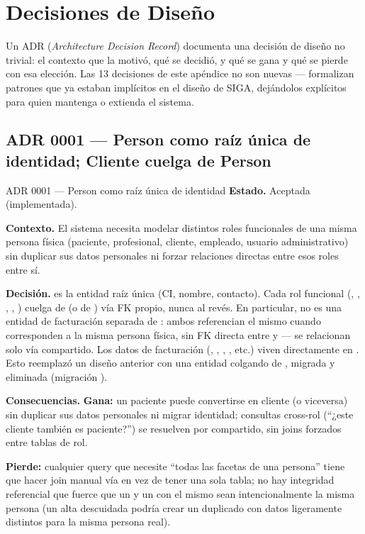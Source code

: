 \chapter{Decisiones de Diseño}
\label{sec:adr}

Un ADR (\emph{Architecture Decision Record}) documenta una decisión de diseño no trivial: el contexto que la motivó, qué se decidió, y qué se gana y qué se pierde con esa elección. Las 13 decisiones de este apéndice no son nuevas --- formalizan patrones que ya estaban implícitos en el diseño de SIGA, dejándolos explícitos para quien mantenga o extienda el sistema.

\section{ADR 0001 --- Person como raíz única de identidad; Cliente cuelga de Person}
\label{adr:0001}

\begin{cajaADR}{ADR 0001 --- Person como raíz única de identidad}
\textbf{Estado.} Aceptada (implementada).

\textbf{Contexto.} El sistema necesita modelar distintos roles funcionales de una misma persona física (paciente, profesional, cliente, empleado, usuario administrativo) sin duplicar sus datos personales ni forzar relaciones directas entre esos roles entre sí.

\textbf{Decisión.}  es la entidad raíz única (CI, nombre, contacto). Cada rol funcional (, , , , ) cuelga de  (o de ) vía FK propio, nunca al revés. En particular,  no es una entidad de facturación separada de : ambos referencian el mismo  cuando corresponden a la misma persona física, sin FK directa entre  y  --- se relacionan solo vía  compartido. Los datos de facturación (, , , , etc.) viven directamente en . Esto reemplazó un diseño anterior con una entidad  colgando de , migrada y eliminada (migración ).

\textbf{Consecuencias.} \textbf{Gana:} un paciente puede convertirse en cliente (o viceversa) sin duplicar sus datos personales ni migrar identidad; consultas cross-rol (``¿este cliente también es paciente?'') se resuelven por  compartido, sin joins forzados entre tablas de rol.

\textbf{Pierde:} cualquier query que necesite ``todas las facetas de una persona'' tiene que hacer join manual vía  en vez de tener una sola tabla; no hay integridad referencial que fuerce que un  y un  con el mismo  sean intencionalmente la misma persona (un alta descuidada podría crear un  duplicado con datos ligeramente distintos para la misma persona real).
\end{cajaADR}

